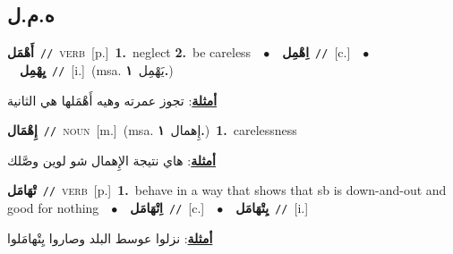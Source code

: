 \documentclass[10pt,a4paper,twoside]{article} %
\begin{document}
\begin{multicols}{2}
\vspace{-3mm}
\subsection*{\color{blue}\foreignlanguage{arabic}{ه.م.ل}\color{blue}{}} 

{\setlength\topsep{0pt}\textbf{\foreignlanguage{arabic}{أَهْمَل}}\ {\color{gray}\texttt{//}\color{black}}\ \textsc{verb}\ [p.]\ \textbf{1.}~neglect  \textbf{2.}~be careless\ \ $\bullet$\ \ \setlength\topsep{0pt}\textbf{\foreignlanguage{arabic}{اِهْمِل}}\ {\color{gray}\texttt{//}\color{black}}\ [c.]\ \ $\bullet$\ \ \setlength\topsep{0pt}\textbf{\foreignlanguage{arabic}{يِهْمِل}}\ {\color{gray}\texttt{//}\color{black}}\ [i.]\ \color{gray}(msa. \foreignlanguage{arabic}{يَهْمِل}~\foreignlanguage{arabic}{\textbf{١.}})\color{black}\  \begin{flushright}\color{gray}\foreignlanguage{arabic}{\textbf{\underline{\foreignlanguage{arabic}{أمثلة}}}: تجوز عمرته وهيه أَهْمَلها هي الثانية}\end{flushright}\color{black}} \vspace{2mm}

{\setlength\topsep{0pt}\textbf{\foreignlanguage{arabic}{إِهْمَال}}\ {\color{gray}\texttt{//}\color{black}}\ \textsc{noun}\ [m.]\ \color{gray}(msa. \foreignlanguage{arabic}{إِهمال}~\foreignlanguage{arabic}{\textbf{١.}})\color{black}\ \textbf{1.}~carelessness\  \begin{flushright}\color{gray}\foreignlanguage{arabic}{\textbf{\underline{\foreignlanguage{arabic}{أمثلة}}}: هاي نتيجة الإِهمال شو لوين وصَّلك}\end{flushright}\color{black}} \vspace{2mm}

{\setlength\topsep{0pt}\textbf{\foreignlanguage{arabic}{تْهَامَل}}\ {\color{gray}\texttt{//}\color{black}}\ \textsc{verb}\ [p.]\ \textbf{1.}~behave in a way that shows that sb is down-and-out and good for nothing\ \ $\bullet$\ \ \setlength\topsep{0pt}\textbf{\foreignlanguage{arabic}{اِتْهَامَل}}\ {\color{gray}\texttt{//}\color{black}}\ [c.]\ \ $\bullet$\ \ \setlength\topsep{0pt}\textbf{\foreignlanguage{arabic}{يِتْهَامَل}}\ {\color{gray}\texttt{//}\color{black}}\ [i.]\  \begin{flushright}\color{gray}\foreignlanguage{arabic}{\textbf{\underline{\foreignlanguage{arabic}{أمثلة}}}: نزلوا عوسط البلد وصاروا يِتْهامَلوا}\end{flushright}\color{black}} \vspace{2mm}


\end{multicols}
\end{document}
